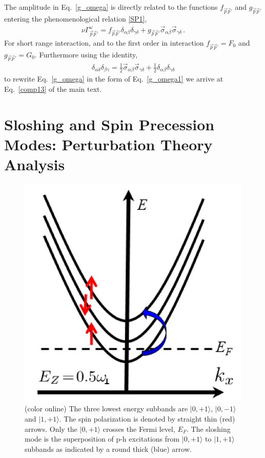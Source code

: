 The amplitude in Eq.~\eqref{g_omega} is directly related to the functions $ f_{\vec{p}\vec{p}'}$ and $ g_{\vec{p}\vec{p}'}$ entering the phenomenological relation \eqref{SP1}, \cite{Pitaevskii1980}
\begin{align}\label{g_omega1}
\nu \Gamma^{\omega}_{\vec{p}\vec{p}'} = f_{\vec{p}\vec{p}'} \delta_{\alpha \beta} \delta_{\gamma \delta} 
+
g_{\vec{p}\vec{p}'} \vec{\sigma}_{\alpha\beta} \vec{\sigma}_{\gamma\delta}\, . 
\end{align}
For short range interaction, and to the first order in interaction $f_{\vec{p}\vec{p}'} = F_0$ and $g_{\vec{p}\vec{p}'} = G_0$.
Furthermore using the identity,
\begin{align}\label{identity}
\delta_{\alpha\delta} \delta_{\beta \gamma} = \frac{1}{2}\vec{\sigma}_{\alpha\beta} \vec{\sigma}_{\gamma\delta} +\frac{1}{2} \delta_{\alpha\beta} \delta_{\gamma\delta}
\end{align}
to rewrite Eq.~\eqref{g_omega} in the form of Eq.~\eqref{g_omega1} we arrive at Eq.~\eqref{comp13}  of the main text.


\chapter{Sloshing and Spin Precession Modes: Perturbation Theory Analysis}

\label{app:Kohn}
\setcounter{equation}{0}

\setcounter{figure}{0}
\begin{figure}[h]
\begin{center}
\includegraphics[width=0.7\columnwidth]{fig8.jpeg}
\caption{(color online) The three lowest energy subbands are $|0,+1\rangle$, $|0,-1\rangle$ and $|1,+1\rangle$.
The spin polarization is denoted by straight thin (red) arrows. 
Only the $|0,+1\rangle$ crosses the Fermi level, $E_F$.
The sloshing mode is the superposition of  p-h excitations from $|0,+1\rangle$ to $|1,+1\rangle$ subbands as indicated by a round thick (blue) arrow.\cite{Iqbal}}
\label{fig:par1}
\end{center}
\end{figure}



